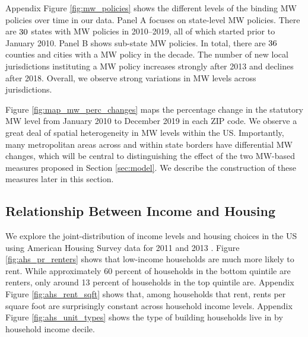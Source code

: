 Appendix Figure \ref{fig:mw_policies} shows the different levels of the binding
MW policies over time in our data.
Panel A focuses on state-level MW policies.
There are $\textnormal{30}$ states with MW policies in 2010--2019, all of 
which started prior to January 2010.
Panel B shows sub-state MW policies.
In total, there are $\textnormal{36}$ counties and cities with a MW policy 
in the decade.
The number of new local jurisdictions instituting a MW policy increases strongly 
after 2013 and declines after 2018.
Overall, we observe strong variations in MW levels across jurisdictions.

Figure \ref{fig:map_mw_perc_changes} maps the percentage change in 
the statutory MW level from January 2010 to December 2019 in each ZIP code.
We observe a great deal of spatial heterogeneity in MW levels within the US.
Importantly, many metropolitan areas across and within state borders have 
differential MW changes, which will be central to distinguishing the effect 
of the two MW-based measures proposed in Section \ref{sec:model}.
We describe the construction of these measures later in this section.

\subsection{Relationship Between Income and Housing}
\label{sec:data_income_housing}

We explore the joint-distribution of income levels and housing choices in the US 
using American Housing Survey data for 2011 and 2013 \parencite{ahs2020}.
Figure \ref{fig:ahs_pr_renters} shows that low-income households are much
more likely to rent.
While approximately 60 percent of households in the bottom quintile are renters,
only around 13 percent of households in the top quintile are.
Appendix Figure \ref{fig:ahs_rent_sqft} shows that, among households that rent, 
rents per square foot are surprisingly constant across household income levels.
Appendix Figure \ref{fig:ahs_unit_types} shows the type of building households
live in by household income decile.

